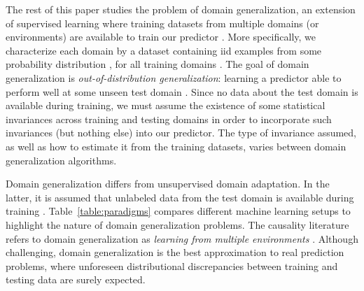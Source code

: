 \documentclass{article}
\begin{document}
The rest of this paper studies the problem of domain generalization, an extension of supervised learning where training datasets from multiple domains (or environments) are available to train our predictor \citep{blanchard2011generalizing}. 
More specifically, we characterize each domain  by a dataset  containing iid examples from some probability distribution , for all training domains .
The goal of domain generalization is \emph{out-of-distribution generalization}: learning a predictor able to perform well at some unseen test domain .
Since no data about the test domain is available during training, we must assume the existence of some statistical invariances across training and testing domains in order to incorporate such invariances (but nothing else) into our predictor.
The type of invariance assumed, as well as how to estimate it from the training datasets, varies between domain generalization algorithms.

Domain generalization differs from unsupervised domain adaptation. In the latter, it is assumed that unlabeled data from the test domain is available during training \citep{pan2009survey, patel2015visual, wilson2018survey}.
Table~\ref{table:paradigms} compares different machine learning setups to highlight the nature of domain generalization problems.
The causality literature refers to domain generalization as \emph{learning from multiple environments} \citep{peters2016causal, arjovsky2019invariant}.
Although challenging, domain generalization is the best approximation to real prediction problems, where unforeseen distributional discrepancies between training and testing data are surely expected.
\end{document}
